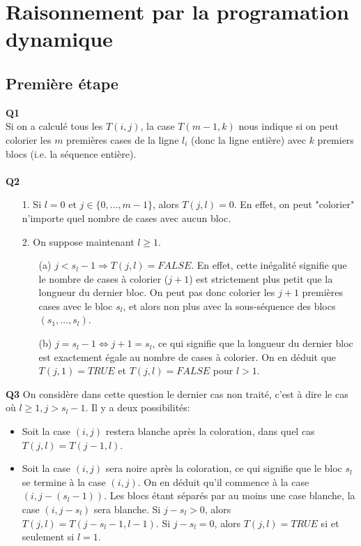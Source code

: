 \documentclass[10pt,a4paper]{article}
\begin{document}
\section{Raisonnement par la programation dynamique}
\subsection{Première étape}
\noindent \textbf{Q1} \\
Si on a calculé tous les $T(i,j)$, la case $T(m-1, k)$ nous indique si on peut colorier les $m$ premières cases de la ligne $l_i$ (donc la ligne entière) avec $k$ premiers blocs (i.e. la séquence entière). \\ \\
\noindent \textbf{Q2}
\begin{itemize}
\item[1.] Si $l = 0$ et $j \in \lbrace 0, \hdots, m-1 \rbrace$, alors $T(j,l) = 0$. En effet, on peut "colorier" n'importe quel nombre de cases avec aucun bloc. \\ 
\item[2.] On suppose maintenant $l \geq 1$.
	\begin{itemize}
		\item[(a)] $j < s_l -1 \Rightarrow T(j,l) = FALSE$. En effet, cette inégalité signifie que le nombre de cases à colorier ($j+1$) est strictement plus petit que la longueur du dernier bloc. On peut pas donc colorier les $j+1$ premières cases avec le bloc $s_l$, et alors non plus avec la sous-séquence des blocs $(s_1, \hdots, s_l)$. 
		\item[(b)] $j = s_l -1 \Leftrightarrow j+1 = s_l$, ce qui signifie que la longueur du dernier bloc est exactement égale au nombre de cases à colorier. On en déduit que $T(j,1) = TRUE$ et $T(j,l) = FALSE$ pour $l > 1$. 
	\end{itemize}
\end{itemize}
\noindent 
\textbf{Q3}
On considère dans cette question le dernier cas non traité, c'est à dire le cas où $l \geq 1, j > s_l -1$. Il y a deux possibilités: 
\begin{itemize}
	\item Soit la case $(i,j)$ restera blanche après la coloration, dans quel cas $T(j,l) = T(j-1,l)$. 
	\item Soit la case $(i,j)$ sera noire après la coloration, ce qui signifie que le bloc $s_l$ se termine à la case $(i,j)$. On en déduit qu'il commence à la case $(i, j - (s_l -1))$. Les blocs étant séparés par au moins une case blanche, la case $(i, j-s_l)$ sera blanche. Si $j-s_l > 0$, alors $T(j, l) = T(j-s_l -1, l-1)$. Si $j-s_l = 0$, alors $T(j,l) = TRUE$ si et seulement si $l = 1$.  
\end{itemize}  
\end{document}
